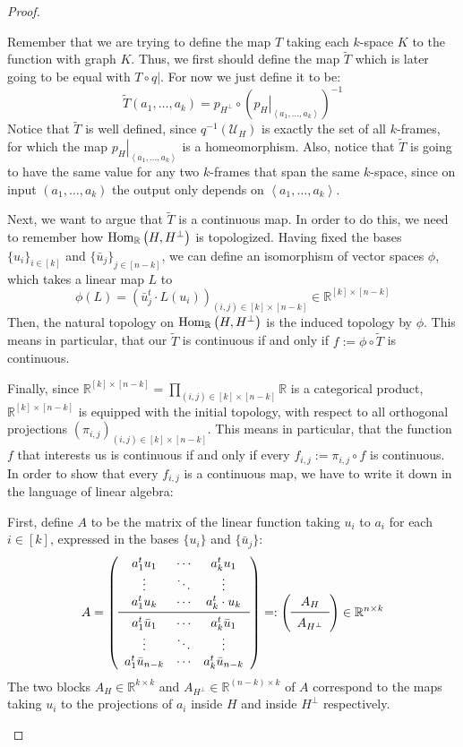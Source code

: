 \begin{proof}
\begin{b_item}
Remember that we are trying to define the map $T$ taking each $k$-space $K$ to the function with graph $K$. Thus, we first should define the map $\tilde T$ which is later going to be equal with $T\circ\left.q\right|$. For now we just define it to be:
\[\tilde T(a_1,\ldots,a_k)=p_{H^{\perp}}\circ{\left(\left.p_H\right|_{\left<a_1,\ldots,a_k\right>}\right)}^{-1}\]
Notice that $\tilde T$ is well defined, since $q^{-1}\left(\mathcal{U}_H\right)$ is exactly the set of all $k$-frames, for which the map $\left.p_H\right|_{\left<a_1,\ldots,a_k\right>}$ is a homeomorphism. Also, notice that $\tilde T$ is going to have the same value for any two $k$-frames that span the same $k$-space, since on input $(a_1,\ldots,a_k)$ the output only depends on $\left<a_1,\ldots,a_k\right>$.

Next, we want to argue that $\tilde T$ is a continuous map. In order to do this, we need to remember how $\mathrm{Hom}_{\mathbb{R}}\left(H,H^{\perp}\right)$ is topologized. Having fixed the bases ${\{u_i\}}_{i\in[k]}$ and ${\{\bar{u}_j\}}_{j\in[n-k]}$, we can define an isomorphism of vector spaces $\phi$, which takes a linear map $L$ to
\[\phi(L)={\left(\bar{u}_j^t\cdot L(u_i)\right)}_{(i,j)\in[k]\times[n-k]}\in\mathbb{R}^{[k]\times[n-k]}\]
Then, the natural topology on $\mathrm{Hom}_{\mathbb{R}}\left(H,H^{\perp}\right)$ is the induced topology by $\phi$. This means in particular, that our $\tilde T$ is continuous if and only if $f:=\phi\circ\tilde T$ is continuous.

Finally, since $\mathbb{R}^{[k]\times[n-k]}=\prod_{(i,j)\in[k]\times[n-k]}\mathbb{R}$ is a categorical product, $\mathbb{R}^{[k]\times[n-k]}$ is equipped with the initial topology, with respect to all orthogonal projections ${\left(\pi_{i,j}\right)}_{(i,j)\in[k]\times[n-k]}$. This means in particular, that the function $f$ that interests us is continuous if and only if every $f_{i,j}:=\pi_{i,j}\circ f$ is continuous. In order to show that every $f_{i,j}$ is a continuous map, we have to write it down in the language of linear algebra:

First, define $A$ to be the matrix of the linear function taking $u_i$ to $a_i$ for each $i\in[k]$, expressed in the bases $\{u_i\}$ and $\{\bar{u}_j\}$:
\[A=\left(\begin{array}{ccc}
a^t_1u_1&\cdots&a^t_ku_1\\
\vdots&\ddots&\vdots\\
a^t_1u_k&\cdots&a^t_k\cdot u_k\\
\midrule
a^t_1\bar{u}_1&\cdots&a^t_k\bar{u}_1\\
\vdots&\ddots&\vdots\\
a^t_1\bar{u}_{n-k}&\cdots&a^t_k\bar{u}_{n-k}\\
\end{array}\right)=:
\left(\begin{array}{c}A_H\\\midrule A_{H^{\perp}}\\
\end{array}\right)
\in\mathbb{R}^{n\times{k}}\]
The two blocks $A_H\in\mathbb{R}^{k\times k}$ and $A_{H^{\perp}}\in\mathbb{R}^{(n-k)\times k}$ of $A$ correspond to the maps taking $u_i$ to the projections of $a_i$ inside $H$ and inside $H^{\perp}$ respectively.


\end{b_item}
\end{proof}
